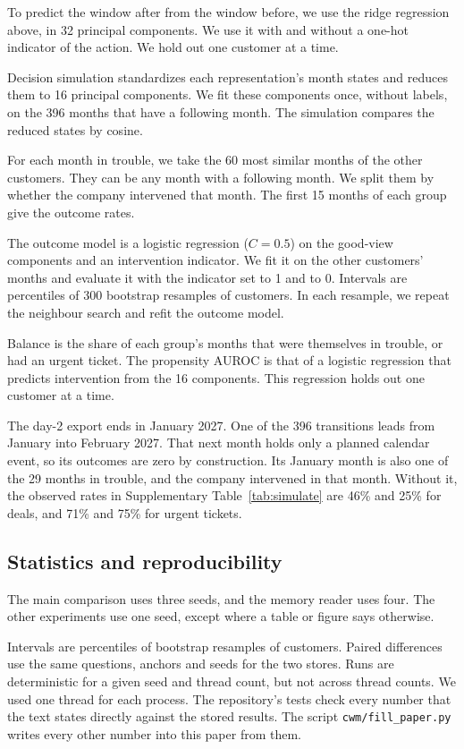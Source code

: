 \documentclass[11pt]{article}
\begin{document}
To predict the window after from the window before, we use the ridge regression above, in 32 principal components. We use it with and without a one-hot indicator of the action. We hold out one customer at a time.

Decision simulation standardizes each representation's month states and reduces them to 16 principal components. We fit these components once, without labels, on the 396 months that have a following month. The simulation compares the reduced states by cosine.

For each month in trouble, we take the 60 most similar months of the other customers. They can be any month with a following month. We split them by whether the company intervened that month. The first 15 months of each group give the outcome rates.

The outcome model is a logistic regression ($C = 0.5$) on the good-view components and an intervention indicator. We fit it on the other customers' months and evaluate it with the indicator set to 1 and to 0. Intervals are percentiles of 300 bootstrap resamples of customers. In each resample, we repeat the neighbour search and refit the outcome model.

Balance is the share of each group's months that were themselves in trouble, or had an urgent ticket. The propensity AUROC is that of a logistic regression that predicts intervention from the 16 components. This regression holds out one customer at a time.

The day-2 export ends in January 2027. One of the 396 transitions leads from January into February 2027. That next month holds only a planned calendar event, so its outcomes are zero by construction. Its January month is also one of the 29 months in trouble, and the company intervened in that month. Without it, the observed rates in Supplementary Table~\ref{tab:simulate} are 46\% and 25\% for deals, and 71\% and 75\% for urgent tickets.

\subsection{Statistics and reproducibility}
The main comparison uses three seeds, and the memory reader uses four. The other experiments use one seed, except where a table or figure says otherwise.

Intervals are percentiles of bootstrap resamples of customers. Paired differences use the same questions, anchors and seeds for the two stores. Runs are deterministic for a given seed and thread count, but not across thread counts. We used one thread for each process. The repository's tests check every number that the text states directly against the stored results. The script \texttt{cwm/fill\_paper.py} writes every other number into this paper from them.
\end{document}
